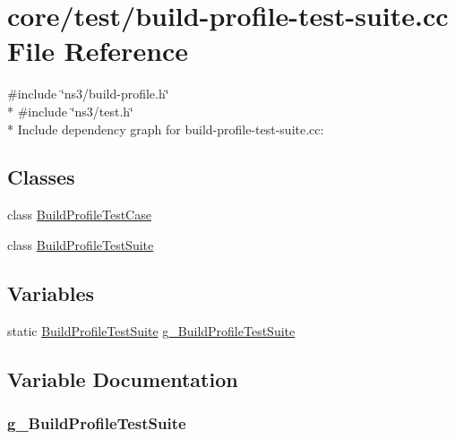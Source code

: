 \hypertarget{build-profile-test-suite_8cc}{}\section{core/test/build-\/profile-\/test-\/suite.cc File Reference}
\label{build-profile-test-suite_8cc}
{\ttfamily \#include \char`\"{}ns3/build-\/profile.\+h\char`\"{}}\\*
{\ttfamily \#include \char`\"{}ns3/test.\+h\char`\"{}}\\*
Include dependency graph for build-\/profile-\/test-\/suite.cc\+:
\subsection*{Classes}
\begin{DoxyCompactItemize}
\item 
class \hyperlink{classBuildProfileTestCase}{Build\+Profile\+Test\+Case}
\item 
class \hyperlink{classBuildProfileTestSuite}{Build\+Profile\+Test\+Suite}
\end{DoxyCompactItemize}
\subsection*{Variables}
\begin{DoxyCompactItemize}
\item 
static \hyperlink{classBuildProfileTestSuite}{Build\+Profile\+Test\+Suite} \hyperlink{build-profile-test-suite_8cc_a4a1850a9c750deb5a5d186ddf77221aa}{g\+\_\+\+Build\+Profile\+Test\+Suite}
\end{DoxyCompactItemize}


\subsection{Variable Documentation}
\subsubsection[{\texorpdfstring{g\+\_\+\+Build\+Profile\+Test\+Suite}{g_BuildProfileTestSuite}}]{ g\+\_\+\+Build\+Profile\+Test\+Suite\hspace{0.3cm}{\ttfamily [static]}}\hypertarget{build-profile-test-suite_8cc_a4a1850a9c750deb5a5d186ddf77221aa}{}\label{build-profile-test-suite_8cc_a4a1850a9c750deb5a5d186ddf77221aa}
